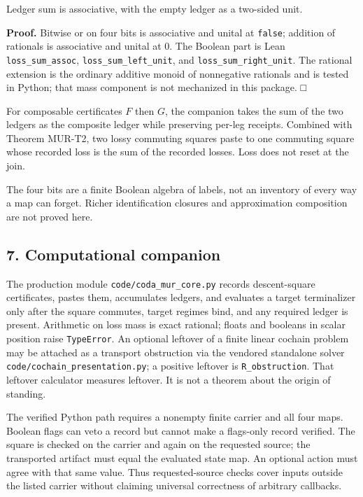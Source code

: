 \documentclass[
  11pt,
]{article}
\begin{document}
Ledger sum is associative, with the empty ledger as a two-sided unit.

\textbf{Proof.} Bitwise or on four bits is associative and unital at \texttt{false}; addition of rationals is associative and unital at \(0\). The Boolean part is Lean \texttt{loss\_sum\_assoc}, \texttt{loss\_sum\_left\_unit}, and \nolinkurl{loss_sum_right_unit}. The rational extension is the ordinary additive monoid of nonnegative rationals and is tested in Python; that mass component is not mechanized in this package. □

For composable certificates \(F\) then \(G\), the companion takes the sum of the two ledgers as the composite ledger while preserving per-leg receipts. Combined with Theorem MUR-T2, two lossy commuting squares paste to one commuting square whose recorded loss is the sum of the recorded losses. Loss does not reset at the join.

The four bits are a finite Boolean algebra of labels, not an inventory of every way a map can forget. Richer identification closures and approximation composition are not proved here.

\subsection{7. Computational companion}\label{computational-companion}

The production module \nolinkurl{code/coda_mur_core.py} records descent-square certificates, pastes them, accumulates ledgers, and evaluates a target terminalizer only after the square commutes, target regimes bind, and any required ledger is present. Arithmetic on loss mass is exact rational; floats and booleans in scalar position raise \texttt{TypeError}. An optional leftover of a finite linear cochain problem may be attached as a transport obstruction via the vendored standalone solver \nolinkurl{code/cochain_presentation.py}; a positive leftover is \texttt{R\_obstruction}. That leftover calculator measures leftover. It is not a theorem about the origin of standing.

The verified Python path requires a nonempty finite carrier and all four maps. Boolean flags can veto a record but cannot make a flags-only record verified. The square is checked on the carrier and again on the requested source; the transported artifact must equal the evaluated state map. An optional action must agree with that same value. Thus requested-source checks cover inputs outside the listed carrier without claiming universal correctness of arbitrary callbacks.
\end{document}
